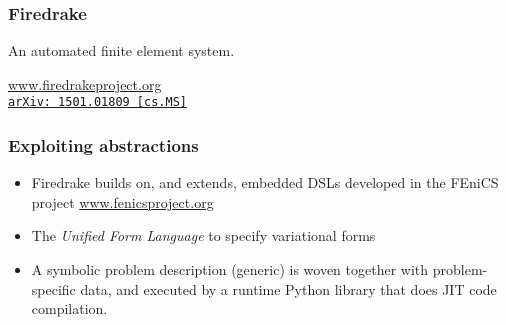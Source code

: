 \documentclass[presentation]{beamer}
\newcommand{\arxivlink}[2]{%
  \href{http://www.arxiv.org/abs/#1}%
  {{\small\texttt{arXiv:\,#1\,[#2]}}}%
}
\begin{document}
\begin{frame}
  \frametitle{Firedrake}
  An automated finite element system.

  \begin{center}
    \url{www.firedrakeproject.org}\\
    \cite{Rathgeber:2016} \arxivlink{1501.01809}{cs.MS}
  \end{center}

  \begin{overlayarea}{\textwidth}{0.6\textheight}
  \end{overlayarea}
\end{frame}

\begin{frame}
  \frametitle{Exploiting abstractions}
  \begin{itemize}
  \item Firedrake builds on, and extends, embedded DSLs developed in
    the FEniCS project \url{www.fenicsproject.org}
  \item The \emph{Unified Form Language} \parencite{Alnaes:2014} to
    specify variational forms
  \item A symbolic problem description (generic) is woven together with
    problem-specific data, and executed by a runtime Python library
    that does JIT code compilation.
  \end{itemize}
\end{frame}
\end{document}
